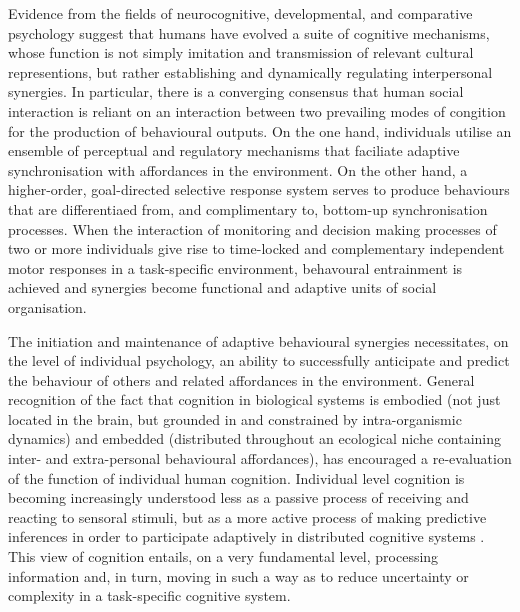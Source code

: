\documentclass[12pt]{report}
\begin{document}
Evidence from the fields of neurocognitive, developmental, and comparative psychology suggest that humans have evolved a suite of cognitive mechanisms, whose function is not simply imitation and transmission of relevant cultural representions, but rather establishing and dynamically regulating interpersonal synergies.  In particular, there is a converging consensus that human social interaction is reliant on an interaction between two prevailing modes of congition for the production of behavioural outputs.  On the one hand, individuals utilise an ensemble of perceptual and regulatory mechanisms that faciliate adaptive synchronisation with affordances in the environment.  On the other hand, a higher-order, goal-directed selective response system serves to produce behaviours that are differentiaed from, and complimentary to, bottom-up synchronisation processes. When the interaction of monitoring and decision making processes of two or more individuals give rise to time-locked and complementary independent motor responses in a task-specific environment, behavoural entrainment is achieved and synergies become functional and adaptive units of social organisation.

The initiation and maintenance of adaptive behavioural synergies necessitates, on the level of individual psychology, an ability to successfully anticipate and predict the behaviour of others and related affordances in the environment.  General recognition of the fact that cognition in biological systems is embodied (not just located in the brain, but grounded in and constrained by intra-organismic dynamics) and embedded (distributed throughout an ecological niche containing inter- and extra-personal behavioural affordances), has encouraged a re-evaluation of the function of individual human cognition.  Individual level cognition is becoming increasingly understood less as a passive process of receiving and reacting to sensoral stimuli, but as a more active process of making predictive inferences in order to participate adaptively in distributed cognitive systems \citep{Marsh2009a}.  This view of cognition entails, on a very fundamental level, processing information and, in turn, moving in such a way as to reduce uncertainty or complexity in a task-specific cognitive system.
\end{document}
